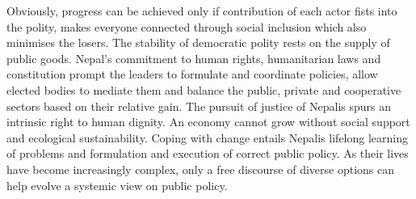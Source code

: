 \documentclass[
  openany]{book}
\begin{document}
Obviously, progress can be achieved only if contribution of each actor fists into the polity, makes everyone connected through social inclusion which also minimises the losers. The stability of democratic polity rests on the supply of public goods. Nepal's commitment to human rights, humanitarian laws and constitution prompt the leaders to formulate and coordinate policies, allow elected bodies to mediate them and balance the public, private and cooperative sectors based on their relative gain. The pursuit of justice of Nepalis spurs an intrinsic right to human dignity. An economy cannot grow without social support and ecological sustainability. Coping with change entails Nepalis lifelong learning of problems and formulation and execution of correct public policy. As their lives have become increasingly complex, only a free discourse of diverse options can help evolve a systemic view on public policy.
\end{document}
